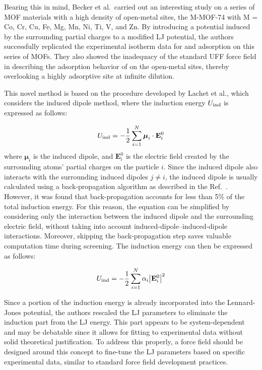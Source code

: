\documentclass[main]{subfiles}
\begin{document}
Bearing this in mind, Becker et al.\ carried out an interesting study on a series of MOF materials with a high density of open-metal sites, the M-MOF-74 with M = Co, Cr, Cu, Fe, Mg, Mn, Ni, Ti, V, and Zn.\autocite{Becker_2017} By introducing a potential induced by the surrounding partial charges to a modified LJ potential, the authors successfully replicated the experimental isotherm data for  and  adsorption on this series of MOFs. They also showed the inadequacy of the standard UFF force field in describing the adsorption behavior of  on the open-metal sites, thereby overlooking a highly adsorptive site at infinite dilution.

This novel method is based on the procedure developed by Lachet et al.\autocite{Lachet_1998}, which considers the induced dipole method, where the induction energy $U_{\text{ind}}$ is expressed as follows:

\begin{equation}
  U_{\text{ind}} = -\frac{1}{2} \sum_{i=1}^{N} \boldsymbol{\mu}_i \cdot \mathbf{E}_i^0
\end{equation}
where $\boldsymbol{\mu}_i$ is the induced dipole, and $\mathbf{E}_i^0$ is the electric field created by the surrounding atoms' partial charges on the particle $i$. Since the induced dipole also interacts with the surrounding induced dipoles $j$$\neq$$i$, the induced dipole is usually calculated using a back-propagation algorithm as described in the Ref.~\cite{Lachet_1998}. However, it was found that back-propagation accounts for less than {5\%} of the total induction energy. For this reason, the equation can be simplified by considering only the interaction between the induced dipole and the surrounding electric field, without taking into account induced-dipole--induced-dipole interactions. Moreover, skipping the back-propagation step saves valuable computation time during screening. The induction energy can then be expressed as follows:

\begin{equation}
  U_{\text{ind}} = -\frac{1}{2} \sum_{i=1}^{N} \alpha_i {\left\lvert\mathbf{E}_i^0\right\rvert}^2
\end{equation}

Since a portion of the induction energy is already incorporated into the Lennard-Jones potential, the authors rescaled the LJ parameters to eliminate the induction part from the LJ energy. This part appears to be system-dependent and may be debatable since it allows for fitting to experimental data without solid theoretical justification. To address this properly, a force field should be designed around this concept to fine-tune the LJ parameters based on specific experimental data, similar to standard force field development practices.
\end{document}
